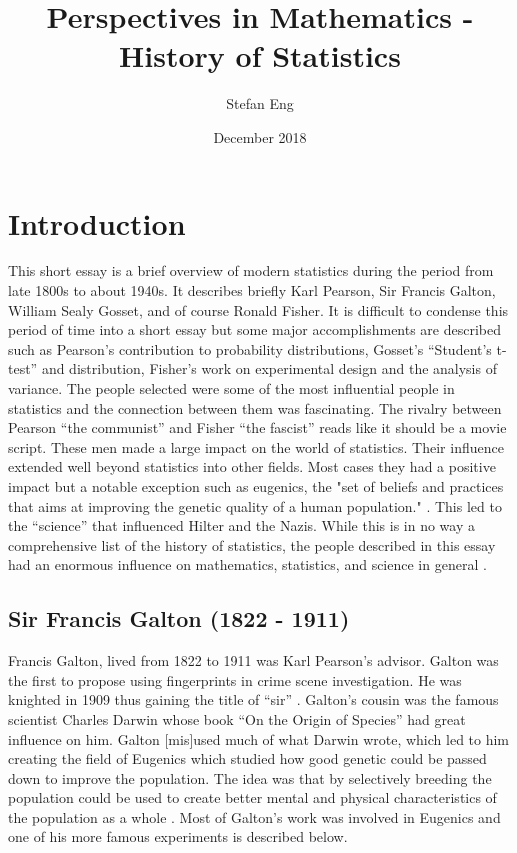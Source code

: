 \documentclass{article}
\title{Perspectives in Mathematics - History of Statistics}
\author{Stefan Eng}
\date{December 2018}
\begin{document}
\maketitle

\section{Introduction}
This short essay is a brief overview of modern statistics during the period from late 1800s to about 1940s.
It describes briefly Karl Pearson, Sir Francis Galton, William Sealy Gosset, and of course Ronald Fisher.
It is difficult to condense this period of time into a short essay but some major accomplishments are described such as Pearson's contribution to probability distributions, Gosset's ``Student's t-test'' and distribution, Fisher's work on experimental design and the analysis of variance.
The people selected were some of the most influential people in statistics and the connection between them was fascinating.
The rivalry between Pearson ``the communist'' and Fisher ``the fascist'' reads like it should be a movie script.
These men made a large impact on the world of statistics.
Their influence extended well beyond statistics into other fields.
Most cases they had a positive impact but a notable exception such as eugenics, the "set of beliefs and practices that aims at improving the genetic quality of a human population." \cite{wiki:eugenics}.
This led to the ``science'' that influenced Hilter and the Nazis.
While this is in no way a comprehensive list of the history of statistics, the people described in this essay had an enormous influence on mathematics, statistics, and science in general \cite{wiki:history_stats}.

\subsection{Sir Francis Galton (1822 - 1911)}
Francis Galton, lived from 1822 to 1911 was Karl Pearson's advisor.
Galton was the first to propose using fingerprints in crime scene investigation.
He was knighted in 1909 thus gaining the title of ``sir'' \cite{britannica_galton}.
Galton's cousin was the famous scientist Charles Darwin whose book ``On the Origin of Species'' had great influence on him.
Galton [mis]used much of what Darwin wrote, which led to him creating the field of Eugenics which studied how good genetic could be passed down to improve the population.
The idea was that by selectively breeding the population could be used to create better mental and physical characteristics of the population as a whole \cite{britannica_galton}.
Most of Galton's work was involved in Eugenics and one of his more famous experiments is described below.
\end{document}
